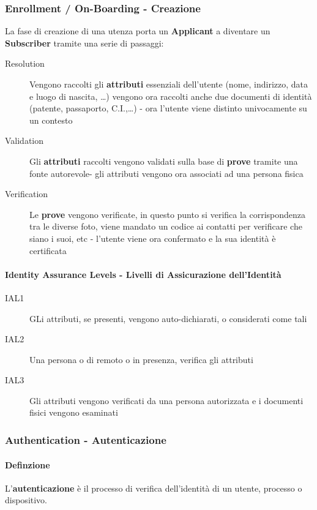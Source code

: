         \subsubsection{Enrollment / On-Boarding - Creazione}
            La fase di creazione di una utenza porta un \textbf{Applicant} a diventare un \textbf{Subscriber} tramite una serie di passaggi:
            \begin{description}
                \item[Resolution] Vengono raccolti gli \textbf{attributi} essenziali dell'utente (nome, indirizzo, data e luogo di nascita, \dots) vengono ora raccolti anche due documenti di identità (patente, passaporto, C.I.,\dots) - ora l'utente viene distinto univocamente su un contesto
                \item[Validation] Gli \textbf{attributi} raccolti vengono validati sulla base di \textbf{prove} tramite una fonte autorevole- gli attributi vengono ora associati ad una persona fisica 
                \item[Verification] Le \textbf{prove} vengono verificate, in questo punto si verifica la corrispondenza tra le diverse foto, viene mandato un codice ai contatti per verificare che siano i suoi, etc - l'utente viene ora confermato e la sua identità è certificata 
            \end{description}
            \paragraph{Identity Assurance Levels - Livelli di Assicurazione dell'Identità}
                \begin{description}
                    \item[IAL1] GLi attributi, se presenti, vengono auto-dichiarati, o considerati come tali
                    \item[IAL2] Una persona o di remoto o in presenza, verifica gli attributi
                    \item[IAL3] Gli attributi vengono verificati da una persona autorizzata e i documenti fisici vengono esaminati
                \end{description}  
        \subsubsection{Authentication - Autenticazione}
            \paragraph{Definzione} L'\textbf{autenticazione} è il processo di verifica dell'identità di un utente, processo o dispositivo.

